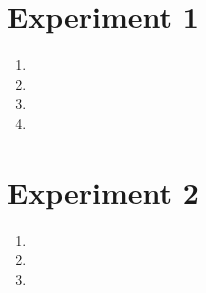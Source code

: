 \documentclass{article}
\begin{document}
\section{Experiment 1}

\begin{enumerate}[label=\alph*.,leftmargin=1.35em]
    \item
    \item
    \item
    \item
\end{enumerate}

\section{Experiment 2}

\begin{enumerate}[label=\alph*.,leftmargin=1.35em]
    \item
    \item
    \item
\end{enumerate}


\end{document}
